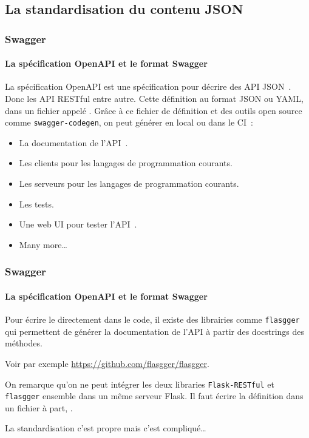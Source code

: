\documentclass{beamer}
\begin{document}
    \subsection{La standardisation du contenu JSON}\label{subsec:api-json}

    \begin{frame}[fragile]
        \transdissolve
        \frametitle{Swagger}
        \framesubtitle{La spécification OpenAPI et le format Swagger}
        La spécification OpenAPI est une spécification pour décrire des API JSON~.
        Donc les API RESTful entre autre.
        \bigbreak
        Cette définition au format JSON ou YAML, dans un fichier appelé .
        \bigbreak
        Grâce à ce fichier de définition et des outils open source comme \lstinline{swagger-codegen}, on peut générer en local ou dans le CI~:
        \begin{itemize}
            \item La documentation de l'API~.
            \item Les clients pour les langages de programmation courants.
            \item Les serveurs pour les langages de programmation courants.
            \item Les tests.
            \item Une web UI pour tester l'API~.
            \item Many more\ldots
        \end{itemize}
    \end{frame}

    \begin{frame}[fragile]
        \transdissolve
        \frametitle{Swagger}
        \framesubtitle{La spécification OpenAPI et le format Swagger}
        Pour écrire le  directement dans le code, il existe des librairies comme \lstinline{flasgger} qui permettent de générer la documentation de l'API à partir des docstrings des méthodes.

        Voir par exemple \url{https://github.com/flasgger/flasgger}.
        \begin{dangercolorbox}
            On remarque qu'on ne peut intégrer les deux libraries \lstinline{Flask-RESTful} et \lstinline{flasgger} ensemble dans un même serveur Flask.
            Il faut écrire la définition dans un fichier  à part, .

            La standardisation c'est propre mais c'est compliqué\ldots
        \end{dangercolorbox}
    \end{frame}
\end{document}
